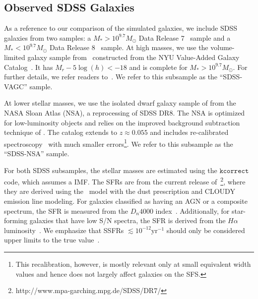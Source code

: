 \documentclass[tighten, preprint]{aastex62}
\begin{document}
\subsection{Observed SDSS Galaxies} \label{sec:obvs}
{\color{red}
As a reference to our comparison of the simulated galaxies,  %
we include SDSS galaxies from two samples: a 
$M_*{>}10^{9.7} M_\odot$ Data Release 7~\citep[DR7;][]{abazajian2009} sample 
and a $M_* < 10^{9.7} M_\odot$ Data Release 8~\citep[DR8;][]{aihara2011} sample.
}
At high masses, we use the volume-limited galaxy sample 
from~\cite{tinker2011} constructed from the NYU Value-Added Galaxy 
Catalog~\citep[VAGC;][]{blanton2005}. It has $M_r - 5\log(h) < -18$
and is complete for $M_* > 10^{9.7} M_\odot$. For further details, 
we refer readers to~\cite{tinker2011,wetzel2013,hahn2017}. 
{\color{red} We refer to this subsample as the ``SDSS-VAGC'' sample.} 

{\color{red} 
At lower stellar masses, we use the isolated dwarf galaxy sample 
of \citet{geha2012} from the NASA Sloan Atlas (NSA), a reprocessing 
of SDSS DR8. The NSA is optimized for low-luminosity objects and 
relies on the improved background subtraction technique of 
\cite{blanton2011}.
}
The catalog extends to $z \approx 0.055$ and 
includes re-calibrated spectroscopy~\citep{yan2011,yan2012} 
with much smaller errors\footnote{This recalibration, however, is mostly 
relevant only at small equivalent width values and hence does not 
largely affect galaxies on the SFS.}.
{\color{red} We refer to this 
subsample as the ``SDSS-NSA'' sample.}

For both SDSS subsamples, the stellar masses are estimated using the 
\citet{blanton2007} $\mathtt{kcorrect}$ code, which assumes a 
\cite{chabrier2003} IMF. The SFRs are from the current release 
of~\citet{brinchmann2004}\footnote{http://www.mpa-garching.mpg.de/SDSS/DR7/}, 
where they are derived using the~\cite{bruzuala.1993} model with the 
\cite{charlot2000} dust prescription and CLOUDY \citep[version C90.04;][]{ferland1996}
emission line modeling. For galaxies classified as having an AGN or a 
composite spectrum, the SFR is measured from the $D_n4000$ index~\citep{balogh1998}. 
Additionally, for star-forming galaxies that have low S/N spectra, the SFR 
is derived from the $H{\alpha}$ luminosity~\citep{brinchmann2004}. 
We emphasize that SSFRs $\lesssim 10^{-12} \mathrm{yr}^{-1}$ should only be 
considered upper limits to the true value~\citep{salim2007}.
\end{document}
